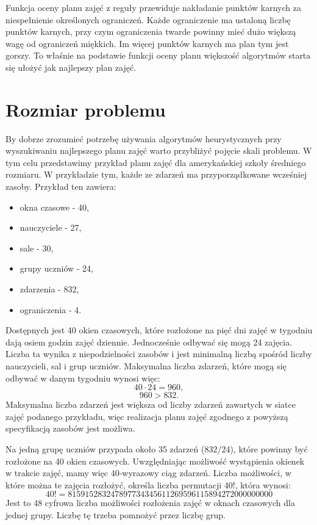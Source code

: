 Funkcja oceny planu zajęć z reguły przewiduje nakładanie punktów karnych za niespełnienie określonych ograniczeń. Każde ograniczenie ma ustaloną liczbę punktów karnych, przy czym ograniczenia twarde powinny mieć dużo większą wagę od ograniczeń miękkich. Im więcej punktów karnych ma plan tym jest gorszy. To właśnie na podstawie funkcji oceny planu większość algorytmów starta się ułożyć jak najlepszy plan zajęć.

\section {Rozmiar problemu}

By dobrze zrozumieć potrzebę używania algorytmów heurystycznych przy wyszukiwaniu najlepszego planu zajęć warto przybliżyć pojęcie skali problemu. W tym celu przedstawimy przykład planu zajęć dla amerykańskiej szkoły średniego rozmiaru. W przykładzie tym, każde ze zdarzeń ma przyporządkowane wcześniej zasoby. Przykład ten zawiera:

\begin{itemize}
	\item okna czasowe - 40,
	\item nauczyciele - 27,
	\item sale - 30,
	\item grupy uczniów - 24,
	\item zdarzenia - 832,
	\item ograniczenia - 4.
\end{itemize}

Dostępnych jest 40 okien czasowych, które rozłożone na pięć dni zajęć w tygodniu dają osiem godzin zajęć dziennie. Jednocześnie odbywać się mogą 24 zajęcia. Liczba ta wynika z niepodzielności zasobów i jest minimalną liczbą spośród liczby nauczycieli, sal i grup uczniów. Maksymalna liczba zdarzeń, które mogą się odbywać w danym tygodniu wynosi więc:
\[ 40 \cdot 24 = 960, \]
\[ 960 > 832. \]
Maksymalna liczba zdarzeń jest większa od liczby zdarzeń zawartych w siatce zajęć podanego przykładu, więc realizacja  planu zajęć zgodnego z powyższą specyfikacją zasobów jest możliwa.

Na jedną grupę uczniów przypada około 35 zdarzeń (832/24), które powinny być rozłożone na 40 okien czasowych. Uwzględniając możliwość wystąpienia okienek w trakcie zajęć, mamy więc 40-wyrazowy ciąg zdarzeń. Liczba możliwości, w które można te zajęcia rozłożyć, określa liczba permutacji 40!, która wynosi:
\[40! = 815915283247897734345611269596115894272000000000\]
Jest to 48 cyfrowa liczba możliwości rozłożenia zajęć w oknach czasowych dla jednej grupy. Liczbę tę trzeba pomnożyć przez liczbę grup.

